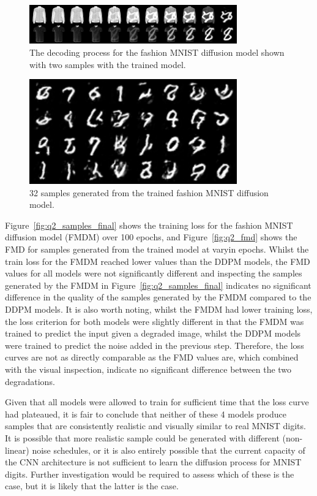 \begin{figure}[t]
    \centering
    \includegraphics[width=0.8\textwidth]{figures/q2_decoding}
    \caption{The decoding process for the fashion MNIST diffusion model shown with two samples with the trained model.}
    \label{fig:q2_decoding}
\end{figure}

\begin{figure}[t]
    \centering
    \includegraphics[width=0.8\textwidth]{figures/q2_samples_final}
    \caption{32 samples generated from the trained fashion MNIST diffusion model.}
    \label{fig:q2_samples_final}
\end{figure}

Figure~\eqref{fig:q2_samples_final} shows the training loss for the fashion MNIST diffusion model (FMDM) over 100 epochs, and
Figure~\eqref{fig:q2_fmd} shows the FMD for samples generated from the trained model at varyin epochs.
Whilst the train loss for the FMDM reached lower values than the DDPM models, the FMD values for all models were
not significantly different and inspecting the samples generated by the FMDM in Figure~\eqref{fig:q2_samples_final}
indicates no significant difference in the quality of the samples generated by the FMDM compared to the DDPM models.
It is also worth noting, whilst the FMDM had lower training loss, the loss criterion for both models were slightly
different in that the FMDM was trained to predict the input  given a degraded image, whilst the DDPM models
were trained to predict the noise added in the previous step.
Therefore, the loss curves are not as directly comparable as the FMD values are, which combined with the visual inspection,
indicate no significant difference between the two degradations.

Given that all models were allowed to train for sufficient time that the loss curve had plateaued, it is fair to conclude
that neither of these 4 models produce samples that are consistently realistic and visually similar to real MNIST
digits.
It is possible that more realistic sample could be generated with different (non-linear) noise schedules, or it is also
entirely possible that the current capacity of the CNN architecture is not sufficient to learn the diffusion process
for MNIST digits.
Further investigation would be required to assess which of these is the case, but it is likely that the latter is the
case.
